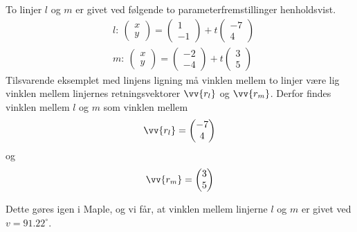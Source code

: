\begin{exa}
	To linjer $l$ og $m$ er givet ved følgende to parameterfremstillinger henholdsvist.
	\begin{align*}
		&l: \ 
		\begin{pmatrix}
			x \\ y
		\end{pmatrix} = 
		\begin{pmatrix}
			1 \\ -1
		\end{pmatrix} + t
		\begin{pmatrix}
			-7 \\ 4
		\end{pmatrix}
		\\
		&m: \ 
		\begin{pmatrix}
			x \\ y
		\end{pmatrix} =
		\begin{pmatrix}
			-2 \\ -4
		\end{pmatrix} + t
		\begin{pmatrix}
			3 \\ 5
		\end{pmatrix}
	\end{align*}
	Tilsvarende eksemplet med linjens ligning må vinklen mellem to linjer være lig vinklen
	mellem linjernes retningsvektorer $\vv{r_l}$ og $\vv{r_m}$. Derfor findes vinklen mellem
	$l$ og $m$ som vinklen mellem 
	\begin{align*}
		\vv{r_l} = 
		\begin{pmatrix}
			-7 \\ 4
		\end{pmatrix}\\
	\end{align*}
	og 
	\begin{align*}
		\vv{r_m} = 
		\begin{pmatrix}
			3 \\ 5
		\end{pmatrix}
	\end{align*}
	
	Dette gøres igen i Maple, og vi får, at vinklen mellem linjerne $l$ og $m$ er givet ved
	$v = 91.22^{\circ}$. 
\end{exa}


